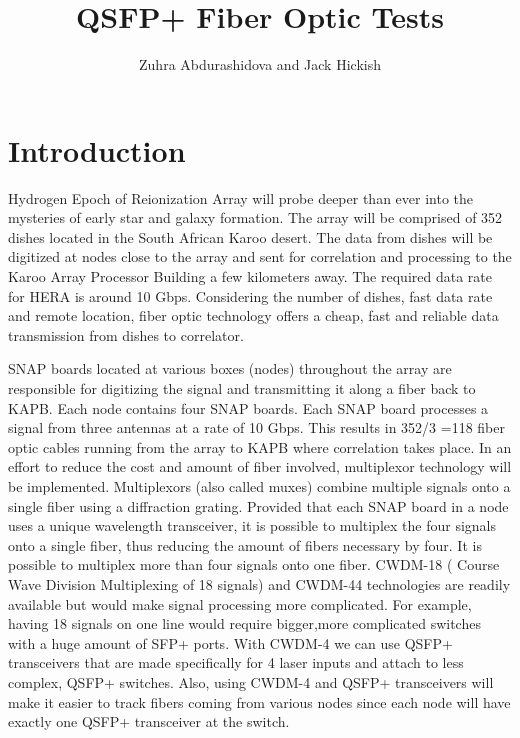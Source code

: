 \documentclass{article}
\begin{document}
\title{QSFP+ Fiber Optic Tests}
\author{Zuhra Abdurashidova and Jack Hickish}
\maketitle



\section*{Introduction}

Hydrogen Epoch of Reionization Array will probe deeper than ever into the mysteries of early star and galaxy formation. The array will be comprised of 352 dishes located in the South African Karoo desert.  The data from dishes will be digitized at nodes close to the array and sent for correlation and processing to the Karoo Array Processor Building a few kilometers away. The required data rate for HERA is around 10 Gbps. Considering the number of dishes, fast data rate and remote location, fiber optic technology offers a cheap, fast and reliable data transmission from dishes to correlator. 

SNAP boards located at various boxes (nodes) throughout the array are responsible for digitizing the signal and transmitting it along a fiber back to KAPB. Each node contains four SNAP boards. Each SNAP board processes a signal from three antennas at a rate of 10 Gbps. This results in 352/3 =118 fiber optic cables running from the array to KAPB where correlation takes place. In an effort to reduce the cost and amount of fiber involved, multiplexor technology will be implemented. Multiplexors (also called muxes) combine multiple signals onto a single fiber using a diffraction grating. Provided that each SNAP board in a node uses a unique wavelength transceiver, it is possible to multiplex the four signals onto a single fiber, thus reducing the amount of fibers necessary by four. It is possible to multiplex more than four signals onto one fiber. CWDM-18 ( Course Wave Division Multiplexing of 18 signals) and CWDM-44 technologies are readily available but would make signal processing more complicated. For example, having 18 signals on one line would require bigger,more complicated switches with a huge amount of SFP+ ports. With CWDM-4 we can use QSFP+ transceivers that are made specifically for 4 laser inputs and attach to less complex, QSFP+ switches. Also, using CWDM-4 and QSFP+ transceivers will make it easier to track fibers coming from various nodes since each node will have exactly one QSFP+ transceiver at the switch. 
\end{document}
